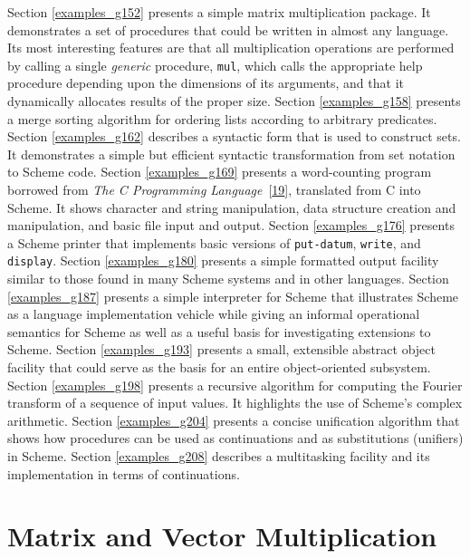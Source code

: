 Section \ref{examples_g152} presents a simple matrix multiplication
package.
It demonstrates a set of procedures that could be written in almost any
language.
Its most interesting features are that all multiplication operations
are performed by calling a single \textit{generic} procedure,
\texttt{mul}, which calls the appropriate help procedure depending upon
the dimensions of its arguments, and that it dynamically allocates
results of the proper size.
Section \ref{examples_g158} presents a merge sorting
algorithm for ordering lists according to arbitrary predicates.
Section \ref{examples_g162} describes a syntactic form that is used to
construct sets.
It demonstrates a simple but efficient syntactic transformation from
set notation to Scheme code.
Section \ref{examples_g169} presents a word-counting program borrowed
from \textit{The C Programming Language} [\hyperref[bibliography_g237]{19}], translated
from C into Scheme.
It shows character and string manipulation, data structure creation and
manipulation, and basic file input and output.
Section \ref{examples_g176} presents a Scheme printer that implements
basic versions of \texttt{put-datum}, \texttt{write}, and
\texttt{display}.
Section \ref{examples_g180} presents a simple formatted output facility
similar to those found in many Scheme systems and in other languages.
Section \ref{examples_g187} presents a simple interpreter for
Scheme that illustrates Scheme as a language implementation vehicle while
giving an informal operational semantics for Scheme as well as a useful
basis for investigating extensions to Scheme.
Section \ref{examples_g193} presents a small, extensible abstract
object facility that could serve as the basis for an entire
object-oriented subsystem.
Section \ref{examples_g198} presents a recursive algorithm for computing
the Fourier transform of a sequence of input values.
It highlights the use of Scheme's complex arithmetic.
Section \ref{examples_g204} presents a concise unification algorithm
that shows how procedures can be used as continuations and as
substitutions (unifiers) in Scheme.
Section \ref{examples_g208} describes a multitasking facility and its
implementation in terms of continuations.



\section{\label{examples_g152}\label{examples_h1}Matrix and Vector Multiplication\label{examples_SECTEXMATMUL}}




